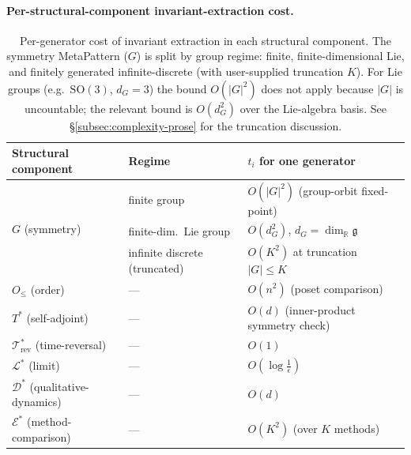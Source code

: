 \documentclass[acmsmall,screen,review]{acmart}
\begin{document}
\paragraph{Per-structural-component invariant-extraction cost.}
\begin{table}[h]
\centering
\caption{Per-generator cost of invariant extraction in each structural component. The symmetry MetaPattern ($G$) is split by group regime: finite, finite-dimensional Lie, and finitely generated infinite-discrete (with user-supplied truncation $K$). For Lie groups (e.g.\ $\mathrm{SO}(3)$, $d_G=3$) the bound $O(|G|^2)$ does not apply because $|G|$ is uncountable; the relevant bound is $O(d_G^2)$ over the Lie-algebra basis. See \S\ref{subsec:complexity-prose} for the truncation discussion.}
\label{tab:complexity}
\small
\begin{tabular}{lll}
\toprule
\textbf{Structural component} & \textbf{Regime} & \textbf{$t_i$ for one generator} \\
\midrule
\multirow{3}{*}{$G$ (symmetry)}
  & finite group & $O(|G|^2)$ (group-orbit fixed-point) \\
  & finite-dim.\ Lie group & $O(d_G^2)$, $d_G = \dim_{\mathbb{R}} \mathfrak{g}$ \\
  & infinite discrete (truncated) & $O(K^2)$ at truncation $|G|\le K$ \\
\midrule
$O_{\le}$ (order) & --- & $O(n^2)$ (poset comparison) \\
$T^{*}$ (self-adjoint) & --- & $O(d)$ (inner-product symmetry check) \\
$\mathcal{T}^{*}_{\mathrm{rev}}$ (time-reversal) & --- & $O(1)$ \\
$\mathcal{L}^{*}$ (limit) & --- & $O(\log\!\frac{1}{\epsilon})$ \\
$\mathcal{D}^{*}$ (qualitative-dynamics) & --- & $O(d)$ \\
$\mathcal{E}^{*}$ (method-comparison) & --- & $O(K^2)$ (over $K$ methods) \\
\bottomrule
\end{tabular}
\end{table}
\end{document}

